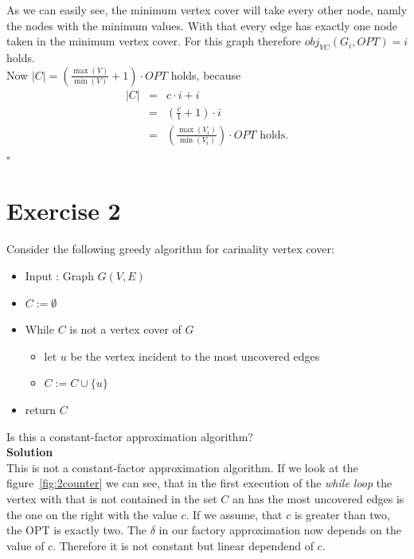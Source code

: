 \documentclass[11pt,a4paper,ngerman]{article}
\begin{document}
\begin{description}
As we can easily see, the minimum vertex cover will take every other node, namly the nodes with the minimum values. With that every edge has exactly one node taken in the minimum vertex cover. For this graph therefore $obj_{VC}(G_i, OPT) = i$ holds.\\

Now $|C| = \left( \frac{\max (V)}{\min (V)} + 1 \right) \cdot OPT$ holds, because
$$
\begin{array}{rcl}
	|C|	&=& c \cdot i + i\\
		&=& \left( \frac{c}{1} + 1 \right) \cdot i\\
		&=& \left( \frac{\max (V_i) }{ \min (V_i) }\right) \cdot OPT \text{ holds.}
\end{array}
$$
\mbox{} \hfill $\square$
\end{description} 


\pagebreak

\section*{Exercise 2}
Consider the following greedy algorithm for carinality vertex cover:
\begin{itemize}
	\item Input : Graph $G(V,E)$
	\item $C := \emptyset$
	\item While $C$ is not a vertex cover of $G$
		\begin{itemize}
			\item let $u$ be the vertex incident to the most uncovered edges
			\item $C := C \cup \{ u \}$
		\end{itemize}
	\item return $C$
\end{itemize}
Is this a constant-factor approximation algorithm?\\

\textbf{Solution}\\
This is not a constant-factor approximation algorithm. If we look at the figure~\ref{fig:2counter} we can see, that in the first execution of the \emph{while loop} the vertex with that is not contained in the set $C$ an has the most uncovered edges is the one on the right with the value $c$. If we assume, that $c$ is greater than two, the OPT is exactly two. The $\delta$ in our factory approximation now depends on the value of $c$. Therefore it is not constant but linear dependend of $c$.
\end{document}
